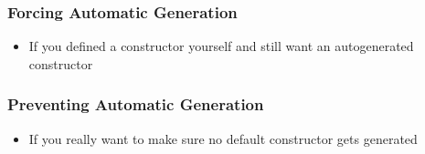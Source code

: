 \begin{frame}
  \frametitle{Forcing Automatic Generation}
  \begin{itemize}
    \item If you defined a constructor yourself and still
          want an autogenerated constructor
  \end{itemize}
\end{frame}

\begin{frame}
  \frametitle{Preventing Automatic Generation}
  \begin{itemize}
    \item If you really want to make sure no default constructor
          gets generated
  \end{itemize}
\end{frame}


